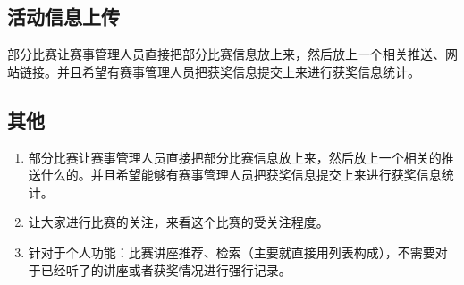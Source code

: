 \documentclass[a4paper,12pt]{article}
\begin{document}
    \subsection{活动信息上传} %
    \label{sub:活动信息上传}
    部分比赛让赛事管理人员直接把部分比赛信息放上来，然后放上一个相关推送、网站链接。并且希望有赛事管理人员把获奖信息提交上来进行获奖信息统计。
    \subsection{其他} %
    \label{sub:其他}
    \begin{enumerate}
        \item 部分比赛让赛事管理人员直接把部分比赛信息放上来，然后放上一个相关的推送什么的。并且希望能够有赛事管理人员把获奖信息提交上来进行获奖信息统计。
        \item 让大家进行比赛的关注，来看这个比赛的受关注程度。
        \item 针对于个人功能：比赛讲座推荐、检索（主要就直接用列表构成），不需要对于已经听了的讲座或者获奖情况进行强行记录。
    \end{enumerate}
    \label{applastpage}
    \newpage
    
    
\iffalse
\begin{itemize}[noitemsep,topsep=0pt]
\end{itemize}
\begin{enumerate}[label=\Roman{*}.,noitemsep,topsep=0pt]
\end{enumerate}
\begin{multicols}{2}
\end{multicols}
\fi
\end{document}
